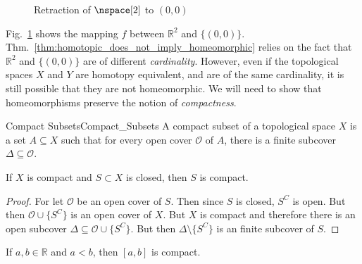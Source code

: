 \documentclass{article}                                                        %
\begin{document}
        \begin{figure}[H]
            \captionsetup{type=figure}
            \centering
            
            \caption{Retraction of $\nspace[2]$ to $(0,0)$}
            \label{fig:homotopy_equivalence_of_plane_with_point}
        \end{figure}
        Fig.~\ref{fig:homotopy_equivalence_of_plane_with_point}
        shows the mapping $f$ between $\mathbb{R}^{2}$ and $\{(0,0)\}$.
        Thm.~\ref{thm:homotopic_does_not_imply_homeomorphic} relies on the
        fact that $\mathbb{R}^{2}$ and $\{(0,0)\}$ are of different
        \textit{cardinality}. However, even if the topological spaces $X$
        and $Y$ are homotopy equivalent, and are of the same cardinality,
        it is still possible that they are not homeomorphic. We will need
        to show that homeomorphisms preserve the notion of \textit{compactness}.
        \begin{ldefinition}{Compact Subsets}{Compact_Subsets}
            A compact subset of a topological space $X$ is a set $A\subseteq{X}$
            such that for every open cover $\mathcal{O}$ of $A$, there is a
            finite subcover $\Delta\subseteq\mathcal{O}$.
        \end{ldefinition}
        \begin{theorem}
            If $X$ is compact and $S\subset{X}$ is closed, then $S$ is compact.
        \end{theorem}
        \begin{proof}
            For let $\mathcal{O}$ be an open cover of $S$. Then since $S$ is
            closed, $S^{C}$ is open. But then $\mathcal{O}\cup\{S^{C}\}$ is
            an open cover of $X$. But $X$ is compact and therefore there is
            an open subcover $\Delta\subseteq\mathcal{O}\cup\{S^{C}\}$. But
            then $\Delta\setminus\{S^{C}\}$ is an finite subcover of $S$.
        \end{proof}
        \begin{theorem}
            If $a,b\in\mathbb{R}$ and $a<b$, then $[a,b]$ is compact.
        \end{theorem}
\end{document}
